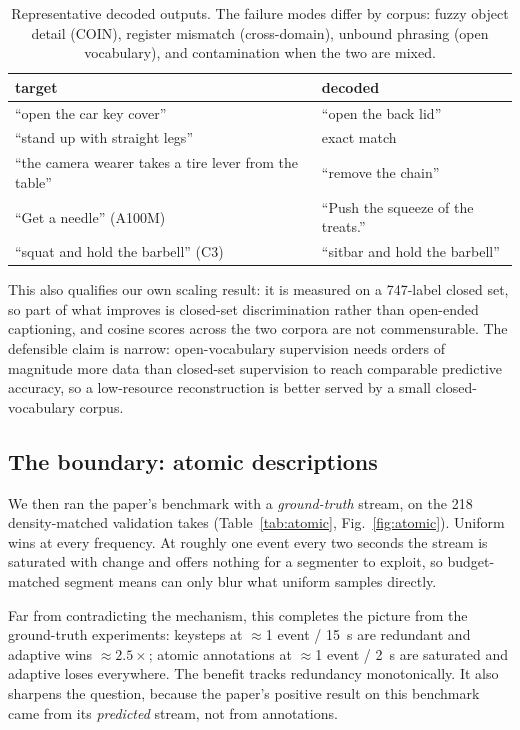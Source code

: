 \documentclass[journal]{IEEEtran}
\begin{document}
\begin{table}[t]
\caption{Representative decoded outputs. The failure modes differ by corpus: fuzzy
object detail (COIN), register mismatch (cross-domain), unbound phrasing (open
vocabulary), and contamination when the two are mixed.}
\label{tab:qual}
\centering
\footnotesize
\setlength{\tabcolsep}{3pt}
\begin{tabular}{p{}p{}}
\toprule
target & decoded \\
\midrule
``open the car key cover'' & ``open the back lid'' \\
``stand up with straight legs'' & exact match \\
``the camera wearer takes a tire lever from the table'' & ``remove the chain'' \\
``Get a needle'' (A100M) & ``Push the squeeze of the treats.'' \\
``squat and hold the barbell'' (C3) & ``sitbar and hold the barbell'' \\
\bottomrule
\end{tabular}
\end{table}

This also qualifies our own scaling result: it is measured on a 747-label closed
set, so part of what improves is closed-set discrimination rather than open-ended
captioning, and cosine scores across the two corpora are not commensurable. The
defensible claim is narrow: open-vocabulary supervision needs orders of magnitude
more data than closed-set supervision to reach comparable predictive accuracy, so
a low-resource reconstruction is better served by a small closed-vocabulary corpus.

\subsection{The boundary: atomic descriptions}
\label{sec:boundary}
We then ran the paper's benchmark with a \emph{ground-truth} stream, on the 218
density-matched validation takes (Table~\ref{tab:atomic},
Fig.~\ref{fig:atomic}). Uniform wins at every frequency. At roughly one event
every two seconds the stream is saturated with change and offers nothing for a
segmenter to exploit, so budget-matched segment means can only blur what uniform
samples directly.

Far from contradicting the mechanism, this completes the picture from the
ground-truth experiments: keysteps at $\approx$1 event / 15~s are redundant and
adaptive wins $\approx 2.5\times$; atomic annotations at $\approx$1 event / 2~s are
saturated and adaptive loses everywhere. The benefit tracks redundancy
monotonically. It also sharpens the question, because the paper's positive result
on this benchmark came from its \emph{predicted} stream, not from annotations.
\end{document}
